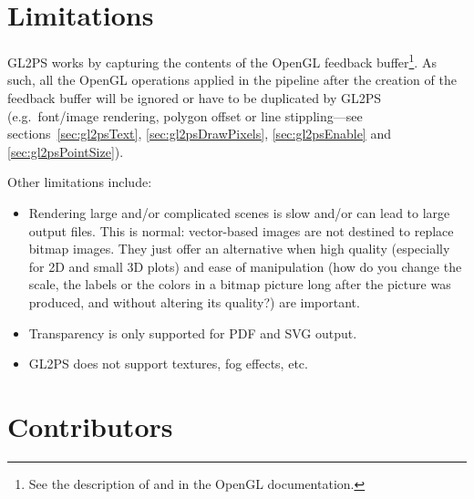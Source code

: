 \section{Limitations}
\label{sec:limitations}

GL2PS works by capturing the contents of the OpenGL feedback
buffer\footnote{See the description of  and
 in the OpenGL documentation.}. As such, all
the OpenGL operations applied in the pipeline after the creation of the
feedback buffer will be ignored or have to be duplicated by GL2PS (e.g.\
font/image rendering, polygon offset or line stippling---see
sections~\ref{sec:gl2psText}, \ref{sec:gl2psDrawPixels},
\ref{sec:gl2psEnable} and \ref{sec:gl2psPointSize}).

Other limitations include:
\begin{itemize}
\item 
Rendering large and/or complicated scenes is slow and/or can lead to large
output files. This is normal: vector-based images are not destined to
replace bitmap images. They just offer an alternative when high quality
(especially for 2D and small 3D plots) and ease of manipulation (how do you
change the scale, the labels or the colors in a bitmap picture long after
the picture was produced, and without altering its quality?) are important.
\item
Transparency is only supported for PDF and SVG output.
\item
GL2PS does not support textures, fog effects, etc.
\end{itemize}

%
%
%
% 
%
%
%

\section{Contributors}
\label{sec:contrib}

